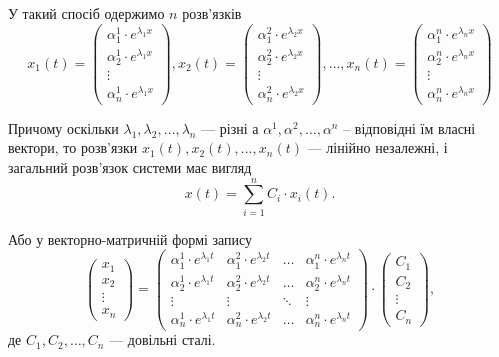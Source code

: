 \begin{enumerate}
У такий спосіб одержимо $n$ розв’язків
\begin{equation*}
	x_1(t) = \begin{pmatrix} \alpha_1^1 \cdot e^{\lambda_1 x} \\ \alpha_2^1 \cdot e^{\lambda_1 x} \\ \vdots \\ \alpha_n^1 \cdot e^{\lambda_1 x} \end{pmatrix}, 
	x_2(t) = \begin{pmatrix} \alpha_1^2 \cdot e^{\lambda_2 x} \\ \alpha_2^2 \cdot e^{\lambda_2 x} \\ \vdots \\ \alpha_n^2 \cdot e^{\lambda_2 x} \end{pmatrix},
	\ldots, 
	x_n(t) = \begin{pmatrix} \alpha_1^n \cdot e^{\lambda_n x} \\ \alpha_2^n \cdot e^{\lambda_n x} \\ \vdots \\ \alpha_n^n \cdot e^{\lambda_n x} \end{pmatrix}
\end{equation*}

Причому оскільки $\lambda_1, \lambda_2, \ldots, \lambda_n$ --- різні а $\alpha^1, \alpha^2, \ldots, \alpha^n$ -- відповідні їм власні вектори, то розв’язки $x_1(t), x_2(t), \ldots, x_n(t)$ --- лінійно незалежні, і загальний розв’язок системи має вигляд
\begin{equation*}
	x(t) = \sum_{i = 1}^n C_i \cdot x_i(t).
\end{equation*}

Або у векторно-матричній формі запису
\begin{equation*}
	\begin{pmatrix} x_1 \\ x_2 \\ \vdots \\ x_n \end{pmatrix} = 
	\begin{pmatrix}
		\alpha_1^1 \cdot e^{\lambda_1 t} & \alpha_1^2 \cdot e^{\lambda_2 t} & \ldots & \alpha_1^n \cdot e^{\lambda_n t} \\
		\alpha_2^1 \cdot e^{\lambda_1 t} & \alpha_2^2 \cdot e^{\lambda_2 t} & \ldots & \alpha_2^n \cdot e^{\lambda_n t} \\
		\vdots & \vdots & \ddots & \vdots \\
		\alpha_n^1 \cdot e^{\lambda_1 t} & \alpha_n^2 \cdot e^{\lambda_2 t} & \ldots & \alpha_n^n \cdot e^{\lambda_n t}
	\end{pmatrix}
	\cdot
	\begin{pmatrix} C_1 \\ C_2 \\ \vdots \\ C_n \end{pmatrix},
\end{equation*}
де $C_1, C_2, \ldots, C_n$ --- довільні сталі.


\end{enumerate}
